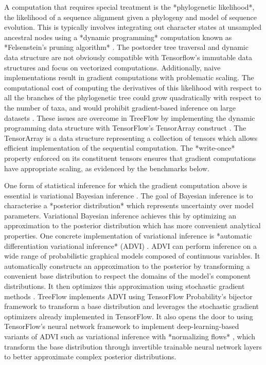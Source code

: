 A computation that requires special treatment is the *phylogenetic likelihood*, the likelihood of a sequence alignment given a phylogeny and model of sequence evolution. This is typically involves integrating out character states at unsampled ancestral nodes using a *dynamic programming* computation known as *Felsenstein's pruning algorithm* \cite{felsenstein1981evolutionary}. The postorder tree traversal and dynamic data structure are not obviously compatible with Tensorflow's immutable data structures and focus on vectorized computations. Additionally, naive implementations result in gradient computations with problematic scaling. The computational cost of computing the derivatives of this likelihood with respect to all the branches of the phylogenetic tree could grow quadratically with respect to the number of taxa, and would prohibit gradient-based inference on large datasets \cite{ji2020gradients}. These issues are overcome in TreeFlow by implementing the dynamic programming data structure with TensorFlow's TensorArray construct \cite{yu2018dynamic}. The TensorArray is a data structure representing a collection of tensors which allows efficient implementation of the sequential computation. The *write-once* property enforced on its constituent tensors ensures that gradient computations have appropriate scaling, as evidenced by the benchmarks below.

One form of statistical inference for which the gradient computation above is essential is variational Bayesian inference \cite{jordan1999introduction}. The goal of Bayesian inference is to characterise a *posterior distribution* which represents uncertainty over model parameters. Variational Bayesian inference achieves this by optimizing an approximation to the posterior distribution which has more convenient analytical properties. One concrete implementation of variational inference is *automatic differentiation variational inference* (ADVI) \cite{kucukelbir2017automatic}. ADVI can perform inference on a wide range of probabilistic graphical models composed of continuous variables. It automatically constructs an approximation to the posterior by transforming a convenient base distribution to respect the domains of the model's component distributions. It then optimizes this approximation using stochastic gradient methods \cite{robbins1951stochastic, bottou2010large}. TreeFlow implements ADVI using TensorFlow Probability's bijector framework to transform a base distribution and leverages the stochastic gradient optimizers already implemented in TensorFlow. It also opens the door to using TensorFlow's neural network framework to implement deep-learning-based variants of ADVI such as variational inference with *normalizing flows* \cite{rezende2015variational}, which transform the base distribution through invertible trainable neural network layers to better approximate complex posterior distributions.

